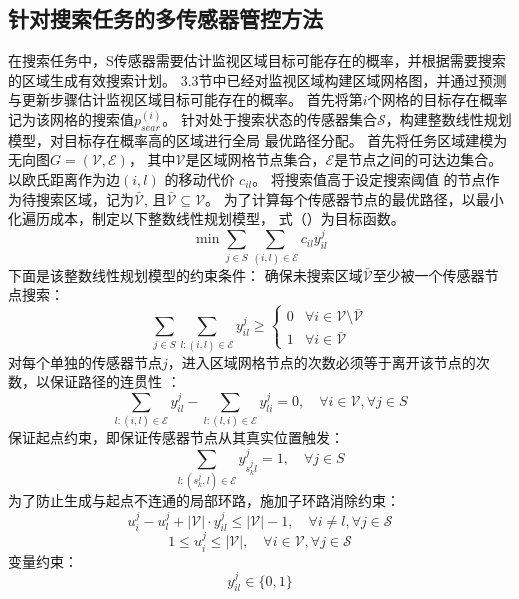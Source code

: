 \subsection{针对搜索任务的多传感器管控方法}
在搜索任务中，S传感器需要估计监视区域目标可能存在的概率，并根据需要搜索的区域生成有效搜索计划。
3.3节中已经对监视区域构建区域网格图，并通过预测与更新步骤估计监视区域目标可能存在的概率。
首先将第$i$个网格的目标存在概率记为该网格的搜索值$p_{sear}^{(i)}$。
针对处于搜索状态的传感器集合$\mathcal{S}$，构建整数线性规划模型，对目标存在概率高的区域进行全局
最优路径分配。
首先将任务区域建模为无向图$G=(\mathcal{V},\mathcal{E})$，
其中$\mathcal{V}$是区域网格节点集合，$\mathcal{E}$是节点之间的可达边集合。
以欧氏距离作为边$(i,l)$ 的移动代价 $c_{il}$。
将搜索值高于设定搜索阈值 的节点作为待搜索区域，记为$\bar{\mathcal{V}}$,
且$\bar{\mathcal{V}} \subseteq \mathcal{V}$。
为了计算每个传感器节点的最优路径，以最小化遍历成本，制定以下整数线性规划模型，
式（）为目标函数。
\begin{equation}
\min\sum_{j\in S}\sum_{(i,l)\in\mathcal{E}}c_{il}y_{il}^j
\end{equation} 
下面是该整数线性规划模型的约束条件：
确保未搜索区域$\bar{\mathcal{V}}$至少被一个传感器节点搜索：
\begin{equation}
\sum_{j\in S}\sum_{l:(i,l)\in\mathcal{E}}y_{il}^j \geq 
\begin{cases}
0 & \forall i\in\mathcal{V}\setminus\bar{\mathcal{V}} \\
1 & \forall i\in\bar{\mathcal{V}}
\end{cases}
\end{equation}
对每个单独的传感器节点$j$，进入区域网格节点的次数必须等于离开该节点的次数，以保证路径的连贯性 ：
\begin{equation}
\sum_{l:(i,l)\in\mathcal{E}}y_{il}^j-\sum_{l:(l,i)\in\mathcal{E}}y_{li}^j=0,\quad\forall i\in\mathcal{V},\forall j\in S
\end{equation} 
保证起点约束，即保证传感器节点从其真实位置触发：
\begin{equation}
\sum_{l:(s_k^j,l)\in\mathcal{E}}y_{s_k^jl}^j=1,\quad\forall j\in S
\end{equation} 
为了防止生成与起点不连通的局部环路，施加子环路消除约束：
\begin{equation}
u_i^j-u_l^j+|\mathcal{V}|\cdot y_{il}^j\leq|\mathcal{V}|-1,\quad\forall i\neq l,\forall j\in\mathcal{S}
\end{equation} 
\begin{equation}
1\leq u_i^j\leq|\mathcal{V}|,\quad\forall i\in\mathcal{V},\forall j\in\mathcal{S}
\end{equation} 
变量约束：
\begin{equation}
y_{il}^j\in\{0,1\}
\end{equation} 

